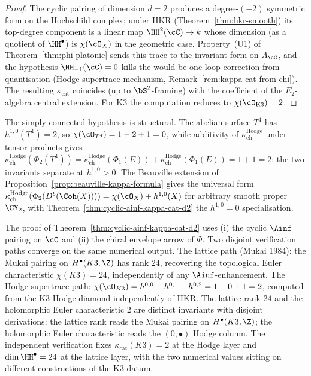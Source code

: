 \begin{proof}
The cyclic pairing of dimension $d = 2$ produces a degree-$(-2)$ symmetric form on the Hochschild complex; under HKR (Theorem~\textup{\ref{thm:hkr-smooth}}) its top-degree component is a linear map $\HH^2(\cC) \to k$ whose dimension (as a quotient of $\HH^\bullet$) is $\chi(\cO_X)$ in the geometric case. Property~\textup{(U1)} of Theorem~\textup{\ref{thm:phi-platonic}} sends this trace to the invariant form on $A_\cC$, and the hypothesis $\HH_{-1}(\cC) = 0$ kills the would-be one-loop correction from quantisation (Hodge-supertrace mechanism, Remark~\textup{\ref{rem:kappa-cat-from-chi}}). The resulting $\kappa_{\mathrm{cat}}$ coincides (up to $\bS^2$-framing) with the coefficient of the $E_2$-algebra central extension. For K3 the computation reduces to $\chi(\cO_{\mathrm{K3}}) = 2$.
\end{proof}

\begin{remark}[Hypothesis \texorpdfstring{$h^{1,0} = 0$}{h-1,0 = 0} is essential]
\label{rem:cyclic-ainf-kappa-d2-hypothesis}
The simply-connected hypothesis is structural. The abelian surface
$T^4$ has $h^{1, 0}(T^4) = 2$, so $\chi(\cO_{T^4}) = 1 - 2 + 1 = 0$,
while additivity of $\kappa_{\mathrm{ch}}^{\mathrm{Hodge}}$ under tensor products gives
$\kappa_{\mathrm{ch}}^{\mathrm{Hodge}}(\Phi_2(T^4)) = \kappa_{\mathrm{ch}}^{\mathrm{Hodge}}(\Phi_1(E)) + \kappa_{\mathrm{ch}}^{\mathrm{Hodge}}(\Phi_1(E)) = 1 + 1 = 2$:
the two invariants separate at $h^{1, 0} > 0$. The Beauville extension
of Proposition~\textup{\ref{prop:beauville-kappa-formula}} gives the
universal form
$\kappa_{\mathrm{ch}}^{\mathrm{Hodge}}(\Phi_2(D^b(\Coh(X)))) = \chi(\cO_X) + h^{1, 0}(X)$
for arbitrary smooth proper $\CY_2$, with
Theorem~\textup{\ref{thm:cyclic-ainf-kappa-cat-d2}} the $h^{1, 0} = 0$
specialisation.
\end{remark}

\begin{remark}
\label{rem:cyclic-ainf-kappa-d2-verification}
The proof of Theorem~\textup{\ref{thm:cyclic-ainf-kappa-cat-d2}} uses (i) the cyclic $\Ainf$ pairing on $\cC$ and (ii) the chiral envelope arrow of $\Phi$. Two disjoint verification paths converge on the same numerical output. The lattice path (Mukai 1984): the Mukai pairing on $H^\bullet(K3, \Z)$ has rank $24$, recovering the topological Euler characteristic $\chi(K3) = 24$, independently of any $\Ainf$-enhancement. The Hodge-supertrace path: $\chi(\cO_{K3}) = h^{0,0} - h^{0,1} + h^{0,2} = 1 - 0 + 1 = 2$, computed from the K3 Hodge diamond independently of HKR. The lattice rank $24$ and the holomorphic Euler characteristic $2$
are distinct invariants with disjoint derivations: the lattice rank
reads the Mukai pairing on $H^\bullet(K3, \Z)$; the holomorphic Euler
characteristic reads the $(0, \bullet)$ Hodge column. The independent
verification fixes
$\kappa_{\mathrm{cat}}(K3) = 2$ at the Hodge layer and
$\dim \HH^\bullet = 24$ at the lattice layer, with the two numerical
values sitting on different constructions of the K3 datum.
\end{remark}

